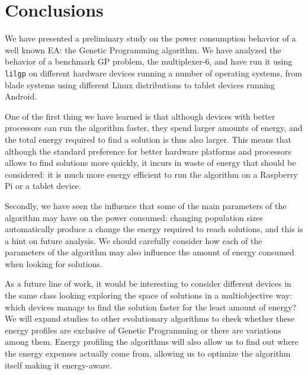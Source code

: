 \section{Conclusions}
\label{conclusions}

We have presented a preliminary study on the power consumption
behavior of a well known EA: the Genetic Programming algorithm.  We
have analyzed the behavior of a benchmark GP problem, the
multiplexer-6, and have run it using {\tt lilgp} on different
hardware devices running a number of operating systems, from blade
systems using different Linux distributions to tablet devices running
Android. 

One of the first thing we have learned is that although devices with
better processors can run the algorithm faster, they spend
larger amounts of energy, and the total energy required to find a
solution is thus also larger.  This means that although the standard
preference for better hardware platforms and processors allows to find
solutions more quickly, it incurs in waste of energy that should be
considered:  it is much more energy efficient to run the algorithm on
a Raspberry Pi or a tablet device. 

Secondly, we have seen the influence that some of the main parameters
of the algorithm may have on the power consumed:  changing population
sizes automatically produce a change the energy required to reach
solutions, and this is a hint on future analysis.  We should carefully
consider how each of the parameters of the algorithm may also
influence the amount of energy consumed when looking for solutions. 

As a future line of work, it would be interesting to consider
different devices in the same class looking exploring the space of
solutions in a multiobjective way: which devices manage to find the
solution faster for the least amount of energy? We will expand studies
to other evolutionary algorithms to check whether these energy
profiles are exclusive of Genetic Programming or there are variations
among them. Energy profiling the algorithms will also allow us to find
out where the energy expenses actually come from, allowing us to
optimize the algorithm itself making it energy-aware.